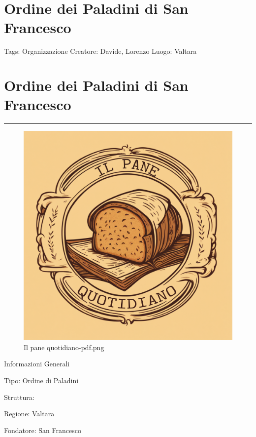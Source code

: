 \section{Ordine dei Paladini di San
Francesco}\label{ordine-dei-paladini-di-san-francesco}

Tags: Organizzazione Creatore: Davide, Lorenzo Luogo: Valtara

\section{Ordine dei Paladini di San
Francesco}\label{ordine-dei-paladini-di-san-francesco-1}

\begin{center}\rule{0.5\linewidth}{0.5pt}\end{center}

\begin{figure}
\centering
\includegraphics{Il_pane_quotidiano-pdf.png}
\caption{Il pane quotidiano-pdf.png}
\end{figure}

Informazioni Generali

Tipo: Ordine di Paladini

Struttura:

Regione: Valtara

Fondatore: San Francesco

